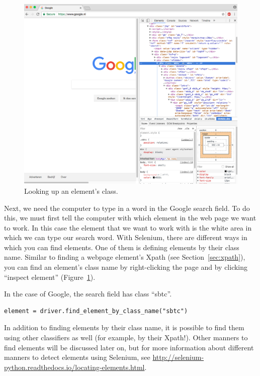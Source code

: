 \documentclass[a4paper,12pt]{book}
\begin{document}
\begin{appendices}
\begin{figure}[h]
\centering
\includegraphics[width=\linewidth,keepaspectratio]{../pictures/selenium.png}
\caption{\label{fig:selenium}Looking up an element's class.}
\end{figure}

Next, we need the computer to type in a word in the Google search field. To do this, we must first tell the computer with which element in the web page we want to work. In this case the element that we want to work with is the white area in which we can type our search word. With Selenium, there are different ways in which you can find elements. One of them is defining elements by their class name. Similar to finding a webpage element’s Xpath (see Section~\ref{sec:xpath}), you can find an element’s class name by right-clicking the page and by clicking ``inspect element'' (Figure~\ref{fig:selenium}). 

In the case of Google, the search field has class ``sbtc''.  

\begin{lstlisting}
element = driver.find_element_by_class_name("sbtc")
\end{lstlisting}

In addition to finding elements by their class name, it is possible to find them using other classifiers as well (for example, by their Xpath!). Other manners to find elements will be discussed later on, but for more information about different manners to detect elements using Selenium, see
\url{http://selenium-python.readthedocs.io/locating-elements.html}.


\end{appendices}
\end{document}
